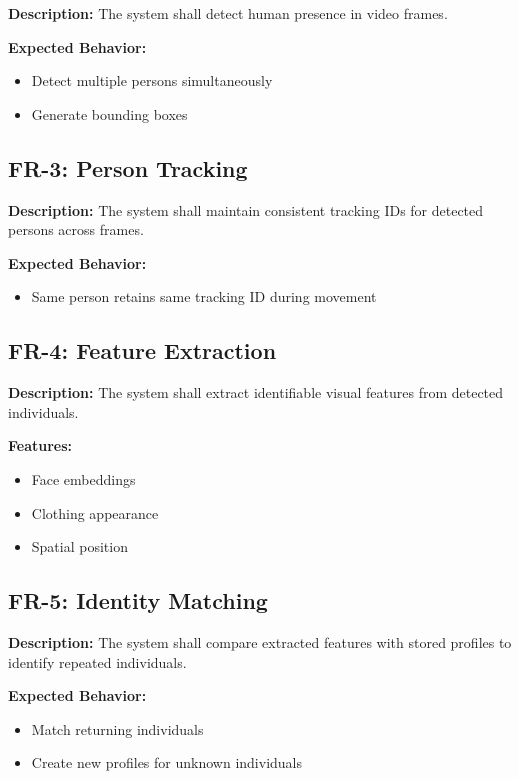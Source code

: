 \documentclass[12pt,a4paper]{article}
\begin{document}
\textbf{Description:}
The system shall detect human presence in video frames.

\textbf{Expected Behavior:}
\begin{itemize}
    \item Detect multiple persons simultaneously
    \item Generate bounding boxes
\end{itemize}

\subsection{FR-3: Person Tracking}

\textbf{Description:}
The system shall maintain consistent tracking IDs for detected persons across frames.

\textbf{Expected Behavior:}
\begin{itemize}
    \item Same person retains same tracking ID during movement
\end{itemize}

\subsection{FR-4: Feature Extraction}

\textbf{Description:}
The system shall extract identifiable visual features from detected individuals.

\textbf{Features:}
\begin{itemize}
    \item Face embeddings
    \item Clothing appearance
    \item Spatial position
\end{itemize}

\subsection{FR-5: Identity Matching}

\textbf{Description:}
The system shall compare extracted features with stored profiles to identify repeated individuals.

\textbf{Expected Behavior:}
\begin{itemize}
    \item Match returning individuals
    \item Create new profiles for unknown individuals
\end{itemize}
\end{document}

